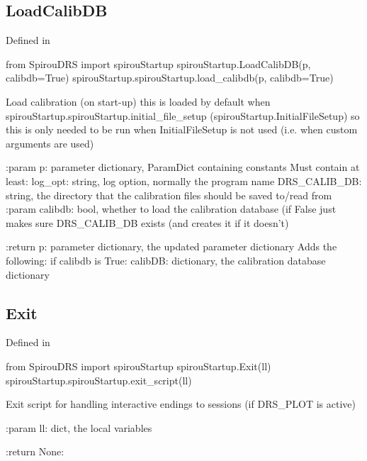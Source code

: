 \noindent\begin{minipage}{\textwidth}
\subsection{LoadCalibDB}

Defined in \spirouStartup{}

\begin{pythonbox}
from SpirouDRS import spirouStartup
spirouStartup.LoadCalibDB(p, calibdb=True)
spirouStartup.spirouStartup.load_calibdb(p, calibdb=True)
\end{pythonbox}

\begin{pythondocstring}
Load calibration (on start-up) this is loaded by default when
spirouStartup.spirouStartup.initial_file_setup
(spirouStartup.InitialFileSetup) so this is only needed to be run when
InitialFileSetup is not used (i.e. when custom arguments are used)


:param p: parameter dictionary, ParamDict containing constants
    Must contain at least:
            log_opt: string, log option, normally the program name
            DRS_CALIB_DB: string, the directory that the calibration
                          files should be saved to/read from
:param calibdb: bool, whether to load the calibration database (if False
                just makes sure DRS_CALIB_DB exists (and creates it if it
                doesn't)

:return p: parameter dictionary, the updated parameter dictionary
        Adds the following:
            if calibdb is True:
                calibDB: dictionary, the calibration database dictionary
\end{pythondocstring}
\end{minipage}




\noindent\begin{minipage}{\textwidth}
\subsection{Exit}

Defined in \spirouStartup{}

\begin{pythonbox}
from SpirouDRS import spirouStartup
spirouStartup.Exit(ll)
spirouStartup.spirouStartup.exit_script(ll)
\end{pythonbox}

\begin{pythondocstring}
Exit script for handling interactive endings to sessions (if DRS_PLOT is
active)

:param ll: dict, the local variables

:return None:
\end{pythondocstring}
\end{minipage}